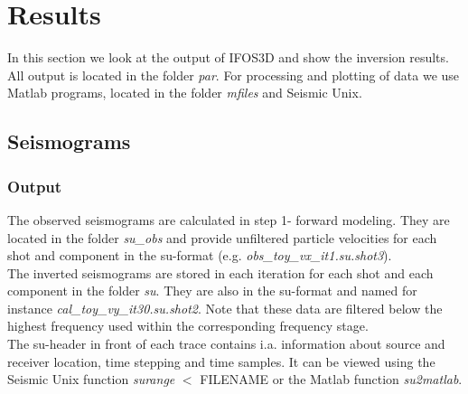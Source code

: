 \section{Results}
In this section we look at the output of IFOS3D and show the inversion results. All output is located in the folder \textit{par}. For processing and plotting of data we use Matlab programs, located in the folder \textit{mfiles} and Seismic Unix.
\subsection{Seismograms}
\subsubsection*{Output}
The observed seismograms are calculated in step 1- forward modeling. They are located in the folder \textit{su\_obs} and provide unfiltered particle velocities for each shot and component in the su-format (e.g. \textit{obs\_toy\_vx\_it1.su.shot3}). \\
The inverted seismograms are stored in each iteration for each shot and each component in the folder \textit{su}. They are also in the su-format and named for instance \textit{cal\_toy\_vy\_it30.su.shot2}. Note that these data are filtered below the highest frequency used within the corresponding frequency stage.\\
The su-header in front of each trace contains i.a. information about source and receiver location, time stepping and time samples. It can be viewed using the Seismic Unix function \textit{surange} $<$ FILENAME or the Matlab function \textit{su2matlab}. 

